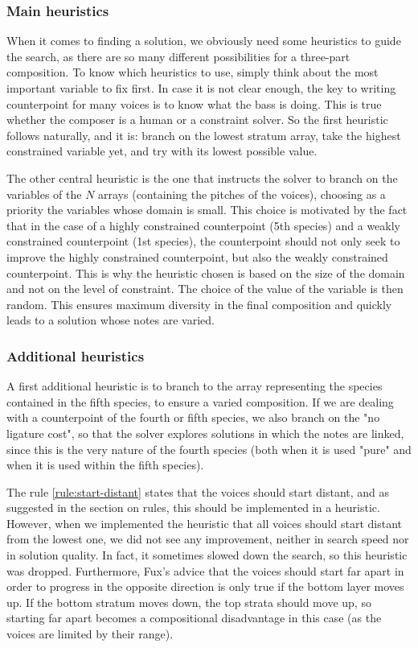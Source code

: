 \subsubsection{Main heuristics}
When it comes to finding a solution, we obviously need some heuristics to guide the search, as there are so many different possibilities for a three-part composition. 
To know which heuristics to use, simply think about the most important variable to fix first. In case it is not clear enough, the key to writing counterpoint for many voices is to know what the bass is doing. This is true whether the composer is a human or a constraint solver. So the first heuristic follows naturally, and it is: branch on the lowest stratum array, take the highest constrained variable yet, and try with its lowest possible value.


The other central heuristic is the one that instructs the solver to branch on the variables of the $N$ arrays (containing the pitches of the voices), choosing as a priority the variables whose domain is small. This choice is motivated by the fact that in the case of a highly constrained counterpoint (5th species) and a weakly constrained counterpoint (1st species), the counterpoint should not only seek to improve the highly constrained counterpoint, but also the weakly constrained counterpoint. This is why the heuristic chosen is based on the size of the domain and not on the level of constraint. The choice of the value of the variable is then random. This ensures maximum diversity in the final composition and quickly leads to a solution whose notes are varied.


\subsubsection{Additional heuristics}
A first additional heuristic is to branch to the array representing the species contained in the fifth species, to ensure a varied composition. If we are dealing with a counterpoint of the fourth or fifth species, we also branch on the "no ligature cost", so that the solver explores solutions in which the notes are linked, since this is the very nature of the fourth species (both when it is used "pure" and when it is used within the fifth species).

The rule \ref{rule:start-distant} states that the voices should start distant, and as suggested in the section on rules, this should be implemented in a heuristic. However, when we implemented the heuristic that all voices should start distant from the lowest one, we did not see any improvement, neither in search speed nor in solution quality. In fact, it sometimes slowed down the search, so this heuristic was dropped. Furthermore, Fux's advice that the voices should start far apart in order to progress in the opposite direction is only true if the bottom layer moves up. If the bottom stratum moves down, the top strata should move up, so starting far apart becomes a compositional disadvantage in this case (as the voices are limited by their range).



